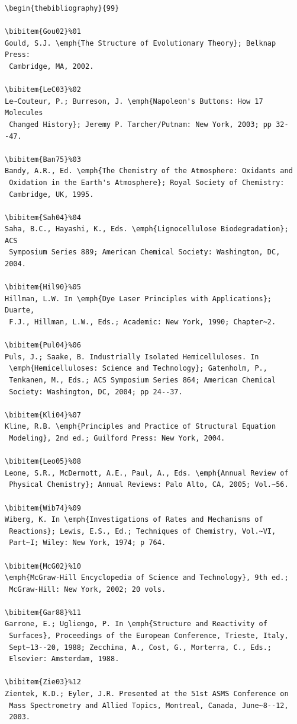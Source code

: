 \documentclass[]{interact}
\theoremstyle{plain}%
\theoremstyle{definition}
\theoremstyle{remark}
\begin{document}
\begin{verbatim}
\begin{thebibliography}{99}

\bibitem{Gou02}%01
Gould, S.J. \emph{The Structure of Evolutionary Theory}; Belknap Press:
 Cambridge, MA, 2002.

\bibitem{LeC03}%02
Le~Couteur, P.; Burreson, J. \emph{Napoleon's Buttons: How 17 Molecules 
 Changed History}; Jeremy P. Tarcher/Putnam: New York, 2003; pp 32--47.

\bibitem{Ban75}%03
Bandy, A.R., Ed. \emph{The Chemistry of the Atmosphere: Oxidants and 
 Oxidation in the Earth's Atmosphere}; Royal Society of Chemistry: 
 Cambridge, UK, 1995.

\bibitem{Sah04}%04
Saha, B.C., Hayashi, K., Eds. \emph{Lignocellulose Biodegradation}; ACS
 Symposium Series 889; American Chemical Society: Washington, DC, 2004.

\bibitem{Hil90}%05
Hillman, L.W. In \emph{Dye Laser Principles with Applications}; Duarte, 
 F.J., Hillman, L.W., Eds.; Academic: New York, 1990; Chapter~2.

\bibitem{Pul04}%06
Puls, J.; Saake, B. Industrially Isolated Hemicelluloses. In
 \emph{Hemicelluloses: Science and Technology}; Gatenholm, P., 
 Tenkanen, M., Eds.; ACS Symposium Series 864; American Chemical 
 Society: Washington, DC, 2004; pp 24--37.

\bibitem{Kli04}%07
Kline, R.B. \emph{Principles and Practice of Structural Equation 
 Modeling}, 2nd ed.; Guilford Press: New York, 2004.

\bibitem{Leo05}%08
Leone, S.R., McDermott, A.E., Paul, A., Eds. \emph{Annual Review of 
 Physical Chemistry}; Annual Reviews: Palo Alto, CA, 2005; Vol.~56.

\bibitem{Wib74}%09
Wiberg, K. In \emph{Investigations of Rates and Mechanisms of 
 Reactions}; Lewis, E.S., Ed.; Techniques of Chemistry, Vol.~VI, 
 Part~I; Wiley: New York, 1974; p 764.

\bibitem{McG02}%10
\emph{McGraw-Hill Encyclopedia of Science and Technology}, 9th ed.;
 McGraw-Hill: New York, 2002; 20 vols.

\bibitem{Gar88}%11
Garrone, E.; Ugliengo, P. In \emph{Structure and Reactivity of 
 Surfaces}, Proceedings of the European Conference, Trieste, Italy,
 Sept~13--20, 1988; Zecchina, A., Cost, G., Morterra, C., Eds.; 
 Elsevier: Amsterdam, 1988.

\bibitem{Zie03}%12
Zientek, K.D.; Eyler, J.R. Presented at the 51st ASMS Conference on 
 Mass Spectrometry and Allied Topics, Montreal, Canada, June~8--12, 
 2003.


\end{verbatim}
\end{document}
